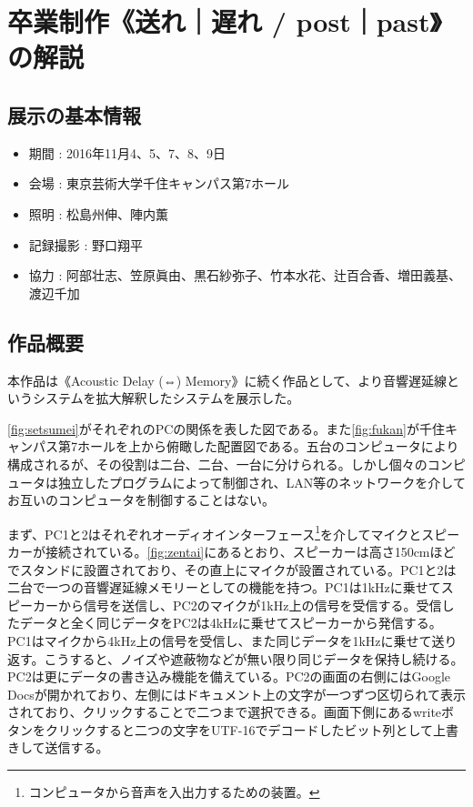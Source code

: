 \documentclass[a4paper,report]{jsbook}
\begin{document}
\section{卒業制作《送れ｜遅れ /
post｜past》の解説}\label{ux5352ux696dux5236ux4f5cux9001ux308cux9045ux308c-postpastux306eux89e3ux8aac}

\subsection{展示の基本情報}\label{ux5c55ux793aux306eux57faux672cux60c5ux5831-1}

\begin{itemize}
\tightlist
\item
  期間 : 2016年11月4、5、7、8、9日
\item
  会場 : 東京芸術大学千住キャンパス第7ホール
\item
  照明 : 松島州伸、陣内薫
\item
  記録撮影 : 野口翔平
\item
  協力 :
  阿部壮志、笠原眞由、黒石紗弥子、竹本水花、辻百合香、増田義基、渡辺千加
\end{itemize}

\subsection{作品概要}\label{ux4f5cux54c1ux6982ux8981-2}

本作品は《Acoustic Delay (⇔)
Memory》に続く作品として、より音響遅延線というシステムを拡大解釈したシステムを展示した。

\cref{fig:setsumei}がそれぞれのPCの関係を表した図である。また\cref{fig:fukan}が千住キャンパス第7ホールを上から俯瞰した配置図である。五台のコンピュータにより構成されるが、その役割は二台、二台、一台に分けられる。しかし個々のコンピュータは独立したプログラムによって制御され、LAN等のネットワークを介してお互いのコンピュータを制御することはない。

まず、PC1と2はそれぞれオーディオインターフェース\footnote{コンピュータから音声を入出力するための装置。}を介してマイクとスピーカーが接続されている。\cref{fig:zentai}にあるとおり、スピーカーは高さ150cmほどでスタンドに設置されており、その直上にマイクが設置されている。PC1と2は二台で一つの音響遅延線メモリーとしての機能を持つ。PC1は1kHzに乗せてスピーカーから信号を送信し、PC2のマイクが1kHz上の信号を受信する。受信したデータと全く同じデータをPC2は4kHzに乗せてスピーカーから発信する。PC1はマイクから4kHz上の信号を受信し、また同じデータを1kHzに乗せて送り返す。こうすると、ノイズや遮蔽物などが無い限り同じデータを保持し続ける。PC2は更にデータの書き込み機能を備えている。PC2の画面の右側にはGoogle
Docsが開かれており、左側にはドキュメント上の文字が一つずつ区切られて表示されており、クリックすることで二つまで選択できる。画面下側にあるwriteボタンをクリックすると二つの文字をUTF-16でデコードしたビット列として上書きして送信する。
\end{document}
